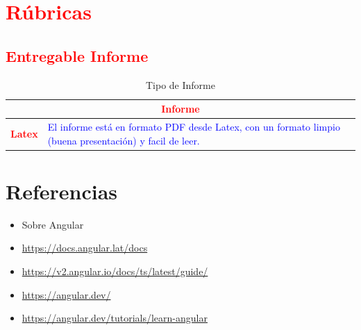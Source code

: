 \documentclass{article}
\begin{document}
\clearpage

	\section{\textcolor{red}{Rúbricas}}
	
	\subsection{\textcolor{red}{Entregable Informe}}
	\begin{table}[H]
		\caption{Tipo de Informe}
		\setlength{\tabcolsep}{0.5em} %
		{\renewcommand{\arraystretch}{1.5}%
		\begin{tabular}{|p{3cm}|p{12cm}|}
			\hline
			\multicolumn{2}{|c|}{\textbf{\textcolor{red}{Informe}}}  \\
			\hline 
			\textbf{\textcolor{red}{Latex}} & \textcolor{blue}{El informe está en formato PDF desde Latex,  con un formato limpio (buena presentación) y facil de leer.}   \\ 
			\hline 
			
			
		\end{tabular}
	}
	\end{table}
	
	
	
	
	


\section{Referencias}
\begin{itemize}			
	\item Sobre Angular
	\item \url{https://docs.angular.lat/docs}
	\item \url{https://v2.angular.io/docs/ts/latest/guide/}
	\item \url{https://angular.dev/}
	\item \url{https://angular.dev/tutorials/learn-angular}
\end{itemize}	
	
%
%
%
\end{document}
